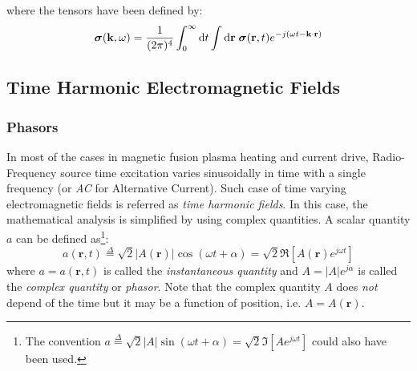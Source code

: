 where the tensors have been defined by:
\begin{subequations}
	\begin{align}
	\boldsymbol{\sigma}(\mathbf{k}, \omega) 	
	=
	\frac{1}{(2\pi)^4}
	\int_0^\infty \mathop{}\!\mathrm{d} t \int \mathop{}\!\mathrm{d} \mathbf{r} \;
	\boldsymbol{\sigma}(\mathbf{r}, t) 	e^{-j(\omega t - \mathbf{k}\cdot\mathbf{r})}
	\end{align}
\end{subequations}



\subsection{Time Harmonic Electromagnetic Fields}
\subsubsection{Phasors}
In most of the cases in magnetic fusion plasma heating and current drive, Radio-Frequency source time excitation varies sinusoidally in time with a single frequency (or \emph{AC} for Alternative Current). Such case of time varying electromagnetic fields is referred as \emph{time harmonic fields}. In this case, the mathematical analysis is simplified by using complex quantities. A scalar quantity $a$ can be defined as\footnote{The convention $ a \stackrel{\Delta}{=} \sqrt{2} |A| \sin (\omega t + \alpha) = \sqrt{2} \Im\left[A e^{j \omega t} \right]$ could also have been used.}:
\begin{equation}
 a(\mathbf{r},t)
  \stackrel{\Delta}{=} 
  \sqrt{2} |A(\mathbf{r})| \cos (\omega t + \alpha) = \sqrt{2} \Re\left[A(\mathbf{r}) e^{j \omega t} \right] \label{eq:phasor}
\end{equation}
where $a=a(\mathbf{r}, t)$ is called the \emph{instantaneous quantity} and $A=|A|e^{j\alpha}$ is called the \emph{complex quantity} or \emph{phasor}. Note that the complex quantity $A$ does \emph{not} depend of the time but it may be a function of position, i.e. $A=A(\mathbf{r})$. 

